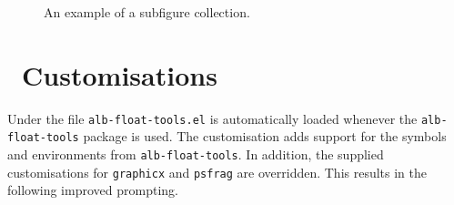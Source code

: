 \documentclass[11pt,a4paper,oneside,titlepage]{alb-latex}
\begin{document}
\begin{description}
\begin{figure}[!t]
\begin{albShelve}[b]
    \end{albShelve}
    \caption[Example subfigure collection]{%
      An example of a subfigure collection.}
    \label{fig:example-subf-coll}
  \end{figure}
\end{description}




\section{\AUCTeX\ Customisations}
\label{sec:alb-float-tools-documentation:auctex-cust}

Under \AUCTeX{} the file \texttt{alb-float-tools.el} is automatically
loaded whenever the \texttt{alb-float-tools} package is used.  The
customisation adds support for the symbols and environments from
\texttt{alb-float-tools}.  In addition, the \AUCTeX{} supplied
customisations for \texttt{graphicx} and \texttt{psfrag} are overridden.
This results in the following improved prompting.
\end{document}
